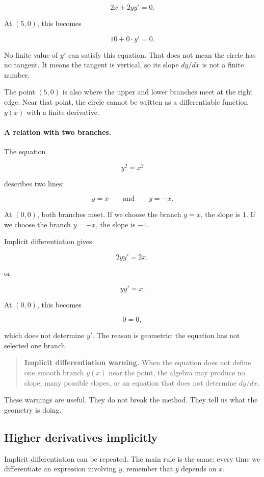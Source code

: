 \[
2x+2yy'=0.
\]

At \((5,0)\), this becomes

\[
10+0\cdot y'=0.
\]

No finite value of \(y'\) can satisfy this equation.  That does not mean the circle has no tangent.  It means the tangent is vertical, so its slope \(dy/dx\) is not a finite number.

The point \((5,0)\) is also where the upper and lower branches meet at the right edge.  Near that point, the circle cannot be written as a differentiable function \(y(x)\) with a finite derivative.

\paragraph{A relation with two branches.}
The equation

\[
y^2=x^2
\]

describes two lines:

\[
y=x
\qquad\text{and}\qquad
y=-x.
\]

At \((0,0)\), both branches meet.  If we choose the branch \(y=x\), the slope is \(1\).  If we choose the branch \(y=-x\), the slope is \(-1\).

Implicit differentiation gives

\[
2yy'=2x,
\]

or

\[
yy'=x.
\]

At \((0,0)\), this becomes

\[
0=0,
\]

which does not determine \(y'\).  The reason is geometric: the equation has not selected one branch.

\begin{quote}
\textbf{Implicit differentiation warning.}
When the equation does not define one smooth branch \(y(x)\) near the point, the algebra may produce no slope, many possible slopes, or an equation that does not determine \(dy/dx\).
\end{quote}

These warnings are useful.  They do not break the method.  They tell us what the geometry is doing.

\subsection{Higher derivatives implicitly}
\label{subsec:higher-derivatives-implicit}

Implicit differentiation can be repeated.  The main rule is the same: every time we differentiate an expression involving \(y\), remember that \(y\) depends on \(x\).

